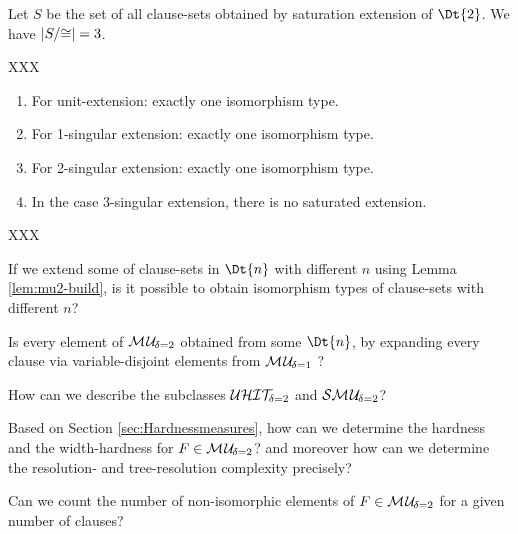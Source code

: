 \documentclass{article}
\begin{document}
\begin{lem}\label{lem:mu2-satur-ext}
  Let $S$ be the set of all clause-sets obtained by saturation extension of $\Dt{2}$. We have $\lvert  S / {\cong} \rvert=3$.
\end{lem}
\begin{prf}
  XXX
  \begin{enumerate}
  \item For unit-extension: exactly one isomorphism type.
  \item For 1-singular extension: exactly one isomorphism type.
  \item For 2-singular extension: exactly one isomorphism type.
  \item In the case 3-singular extension, there is no saturated extension.
  \end{enumerate}
XXX
\end{prf}

\begin{quest}\label{que:mu-2-ism}
If we extend some of clause-sets in $\Dt{n}$ with different $n$ using Lemma \ref{lem:mu2-build}, is it possible to obtain isomorphism types of clause-sets with different $n$?
\end{quest}

\begin{quest}\label{que:mu2-from-mu1}
Is every element of $\mathcal{M\hspace{0.8pt}U}_{\!\delta=2}$ obtained from some $\Dt{n}$, by expanding every clause via variable-disjoint elements from $\mathcal{M\hspace{0.8pt}U}_{\!\delta=1}$ ?
\end{quest}

\begin{quest}\label{que:mu2-uhit2}
How can we describe the subclasses $\mathcal{U}\mathcal{HIT}_{\!\!\delta=2}$ and $\mathcal{S}\mathcal{M\hspace{0.8pt}U}_{\!\delta=2}$?
\end{quest}

\begin{quest}\label{que:mu2-hardness}
Based on Section \ref{sec:Hardnessmeasures}, how can we determine the hardness and the width-hardness for $F \in \mathcal{M\hspace{0.8pt}U}_{\!\delta=2}$? and moreover how can we determine the resolution- and tree-resolution complexity precisely?
\end{quest}

\begin{quest}\label{que:mu2-count}
Can we count the number of non-isomorphic elements of $F \in \mathcal{M\hspace{0.8pt}U}_{\!\delta=2}$ for a given number of clauses?
\end{quest}


\BibliographyOKlibrary
\end{document}
